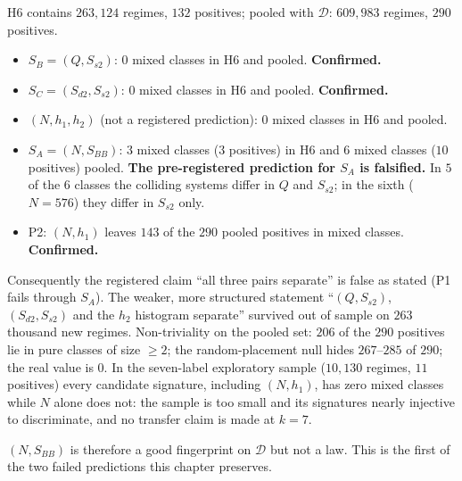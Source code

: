 \begin{observation}\label{obs:preregistered}
H6 contains $263{,}124$ regimes, $132$ positives; pooled with $\mathcal D$: $609{,}983$ regimes, $290$ positives.
\begin{itemize}[nosep]
\item $S_B=(Q,S_{s2})$: $0$ mixed classes in H6 and pooled. \textbf{Confirmed.}
\item $S_C=(S_{d2},S_{s2})$: $0$ mixed classes in H6 and pooled. \textbf{Confirmed.}
\item $(N,h_1,h_2)$ (not a registered prediction): $0$ mixed classes in H6 and pooled.
\item $S_A=(N,S_{BB})$: $3$ mixed classes ($3$ positives) in H6 and $6$ mixed classes ($10$ positives) pooled. \textbf{The pre-registered prediction for $S_A$ is falsified.} In $5$ of the $6$ classes the colliding systems differ in $Q$ and $S_{s2}$; in the sixth ($N=576$) they differ in $S_{s2}$ only.
\item P2: $(N,h_1)$ leaves $143$ of the $290$ pooled positives in mixed classes. \textbf{Confirmed.}
\end{itemize}
Consequently the registered claim ``all three pairs separate'' is false as stated (P1 fails through $S_A$). The weaker, more structured statement ``$(Q,S_{s2})$, $(S_{d2},S_{s2})$ and the $h_2$ histogram separate'' survived out of sample on $263$ thousand new regimes. Non-triviality on the pooled set: $206$ of the $290$ positives lie in pure classes of size $\ge2$; the random-placement null hides $267$--$285$ of $290$; the real value is $0$. In the seven-label exploratory sample ($10{,}130$ regimes, $11$ positives) every candidate signature, including $(N,h_1)$, has zero mixed classes while $N$ alone does not: the sample is too small and its signatures nearly injective to discriminate, and no transfer claim is made at $k=7$.
\end{observation}
$(N,S_{BB})$ is therefore a good fingerprint on $\mathcal D$ but not a law. This is the first of the two failed predictions this chapter preserves.

